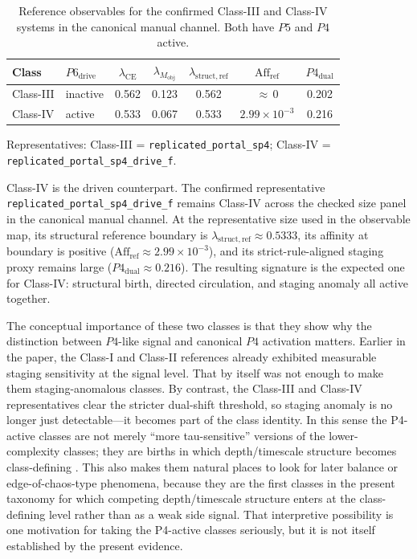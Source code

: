 \documentclass[11pt]{article}
\begin{document}
\begin{table}[tbp]
\centering
\small
\caption{Reference observables for the confirmed Class-III and Class-IV systems in the canonical manual channel.  Both have $P5$ and $P4$ active.}
\label{tab:class-iii-iv-summary}
\setlength{\tabcolsep}{5pt}
\begin{tabular}{@{}llccccc@{}}
\toprule
Class & $P6_{\mathrm{drive}}$
  & $\lambda_{\mathrm{CE}}$
  & $\lambda_{M_{\mathrm{obj}}}$
  & $\lambda_{\mathrm{struct,ref}}$
  & $\mathrm{Aff}_{\mathrm{ref}}$
  & $P4_{\mathrm{dual}}$ \\
\midrule
Class-III & inactive & 0.562 & 0.123 & 0.562 & ${\approx}\,0$             & 0.202 \\
Class-IV  & active   & 0.533 & 0.067 & 0.533 & $2.99\times 10^{-3}$ & 0.216 \\
\bottomrule
\end{tabular}

\smallskip
\begin{flushleft}
\footnotesize
Representatives: Class-III = \texttt{replicated\_portal\_sp4};
Class-IV = \texttt{replicated\_portal\_sp4\_drive\_f}.
\end{flushleft}
\end{table}

Class-IV is the driven counterpart. The confirmed representative
\texttt{replicated\allowbreak\_portal\allowbreak\_sp4\allowbreak\_drive\allowbreak\_f}
remains Class-IV across the checked size panel in the canonical manual channel. At the representative size used in the observable map, its structural reference boundary is $\lambda_{\mathrm{struct,ref}}\approx 0.5333$, its affinity at boundary is positive ($\mathrm{Aff}_{\mathrm{ref}}\approx 2.99\times 10^{-3}$), and its strict-rule-aligned staging proxy remains large ($P4_{\mathrm{dual}}\approx 0.216$). The resulting signature is the expected one for Class-IV: structural birth, directed circulation, and staging anomaly all active together.

The conceptual importance of these two classes is that they show why the distinction between $P4$-like signal and canonical $P4$ activation matters. Earlier in the paper, the Class-I and Class-II references already exhibited measurable staging sensitivity at the signal level. That by itself was not enough to make them staging-anomalous classes. By contrast, the Class-III and Class-IV representatives clear the stricter dual-shift threshold, so staging anomaly is no longer just detectable---it becomes part of the class identity. In this sense the P4-active classes are not merely ``more tau-sensitive'' versions of the lower-complexity classes; they are births in which depth/timescale structure becomes class-defining \cite{landim_2019,defenu_2021}.
This also makes them natural places to look for later balance or edge-of-chaos-type phenomena, because they are the first classes in the present taxonomy for which competing depth/timescale structure enters at the class-defining level rather than as a weak side signal. That interpretive possibility is one motivation for taking the P4-active classes seriously, but it is not itself established by the present evidence.
\end{document}
